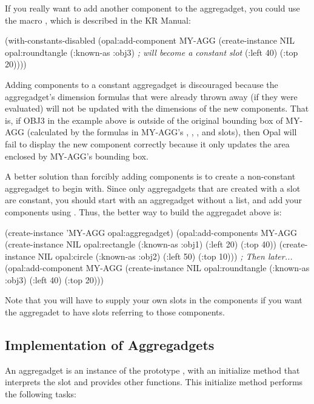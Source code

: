 If you really want to add another component to the aggregadget, you
could use the macro , which is described
in the KR Manual:
\begin{programexample}
(with-constants-disabled
  (opal:add-component MY-AGG (create-instance NIL opal:roundtangle
                               (:known-as :obj3)  {\it ; will become a constant slot}
                               (:left 40) (:top 20))))
\end{programexample}
Adding components to a constant aggregadget is discouraged because
the aggregadget's dimension formulas that
were already thrown away (if they were evaluated) will not be updated with the
dimensions of the new components.  That is, if OBJ3 in the example
above is outside of the original bounding box of MY-AGG
(calculated by the formulas in MY-AGG's , , ,
and  slots), then Opal will fail to display the new
component correctly because it only updates the area enclosed by
MY-AGG's bounding box.

A better solution than forcibly adding components is to create a
non-constant aggregadget to begin with.  Since only aggregadgets that
are created with a  slot are constant, you should start with an
aggregadget without a  list, and add your components using
.  Thus, the better way to build the aggregadet above is:
\begin{programexample}
(create-instance 'MY-AGG opal:aggregadget)
(opal:add-components MY-AGG (create-instance NIL opal:rectangle
                              (:known-as :obj1)
                              (:left 20) (:top 40))
                            (create-instance NIL opal:circle
                              (:known-as :obj2)
                              (:left 50) (:top 10)))
{\it ; Then later...}
(opal:add-component MY-AGG (create-instance NIL opal:roundtangle
                             (:known-as :obj3)
                             (:left 40) (:top 20)))
\end{programexample}
Note that you will have to supply your own  slots in the
components if you want the aggregadet to have slots referring to those
components.


\subsection{Implementation of Aggregadgets}
\label{known-as-sec}
An aggregadget is an instance of the prototype ,
with an initialize method that interprets the  slot
and provides other functions.
This initialize method performs the following tasks:

